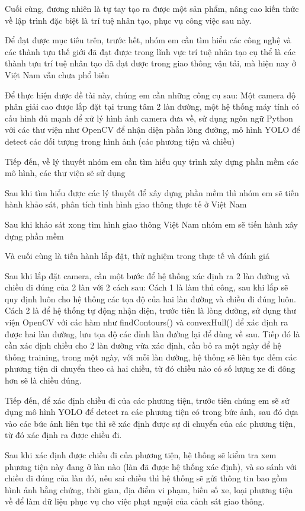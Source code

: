 \documentclass[14pt,oneside,a4paper]{extreport}
\begin{document}
Cuối cùng, đương nhiên là tự tay tạo ra được một sản phẩm, nâng cao kiến thức về lập trình đặc biệt là trí tuệ nhân tạo, phục vụ công việc sau này.

Để đạt được mục tiêu trên, trước hết, nhóm em cần tìm hiểu các công nghệ và các thành tựu thế giới đã đạt được trong lĩnh vực trí tuệ nhân tạo cụ thể là các thành tựu trí tuệ nhân tạo đã đạt được trong giao thông vận tải, mà hiện nay ở Việt Nam vẫn chưa phổ biến

Để thực hiện được đề tài này, chúng em cần những công cụ sau: Một camera độ phân giải cao được lắp đặt tại trung tâm 2 làn đường, một hệ thống máy tính có cấu hình đủ mạnh để xử lý hình ảnh camera đưa về, sử dụng ngôn ngữ Python với các thư viện như OpenCV để nhận diện phần lòng đường, mô hình YOLO để detect các đối tượng trong hình ảnh (các phương tiện và chiều)

Tiếp đến, về lý thuyết nhóm em cần tìm hiểu quy trình xây dựng phần mềm các mô hình, các thư viện sẽ sử dụng

Sau khi tìm hiểu được các lý thuyết để xây dựng phần mềm thì nhóm em sẽ tiến hành khảo sát, phân tích tình hình giao thông thực tế ở Việt Nam

Sau khi khảo sát xong tìm hình giao thông Việt Nam nhóm em sẽ tiến hành xây dựng phần mềm

Và cuối cùng là tiến hành lắp đặt, thử nghiệm trong thực tế và đánh giá

Sau khi lắp đặt camera, cần một bước để hệ thống xác định ra 2 làn đường và chiều đi đúng của 2 làn với 2 cách sau: Cách 1 là làm thủ công, sau khi lắp sẽ quy định luôn cho hệ thống các tọa độ của hai làn đường và chiều đi đúng luôn. Cách 2 là để hệ thống tự động nhận diện, trước tiên là lòng đường, sử dụng thư viện OpenCV với các hàm như findContours() và convexHull() để xác định ra được hai làn đường, lưu tọa độ các đỉnh làn đường lại để dùng về sau. Tiếp đó là cần xác định chiều cho 2 làn đường vừa xác định, cần bỏ ra một ngày để hệ thống training, trong một ngày, với mỗi làn đường, hệ thống sẽ liên tục đếm các phương tiện di chuyển theo cả hai chiều, từ đó chiều nào có số lượng xe đi đông hơn sẽ là chiều đúng.

Tiếp đến, để xác định chiều đi của các phương tiện, trước tiên chúng em sẽ sử dụng mô hình YOLO để detect ra các phương tiện có trong bức ảnh, sau đó dựa vào các bức ảnh liên tục thì sẽ xác định được sự di chuyển của các phương tiện, từ đó xác định ra được chiều đi.

Sau khi xác định được chiều đi của phương tiện, hệ thống sẽ kiểm tra xem phương tiện này đang ở làn nào (làn đã được hệ thống xác định), và so sánh với chiều đi đúng của làn đó, nếu sai chiều thì hệ thống sẽ gửi thông tin bao gồm hình ảnh bằng chứng, thời gian, địa điểm vi phạm, biến số xe, loại phương tiện về để làm dữ liệu phục vụ cho việc phạt nguội của cảnh sát giao thông.
\end{document}
